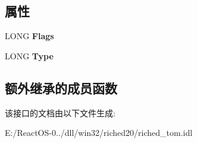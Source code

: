 \subsection*{属性}
\begin{DoxyCompactItemize}
\item 
\mbox{\label{interfacetom_1_1_i_text_selection_adb61c8d597ce766edd46c243d53411e7}} 
L\+O\+NG {\bfseries Flags}
\item 
\mbox{\label{interfacetom_1_1_i_text_selection_a25772c95f3ce8293dcd89d5ce55f8c5e}} 
L\+O\+NG {\bfseries Type}
\end{DoxyCompactItemize}
\subsection*{额外继承的成员函数}


该接口的文档由以下文件生成\+:\begin{DoxyCompactItemize}
\item 
E\+:/\+React\+O\+S-\/0../dll/win32/riched20/riched\+\_\+tom.\+idl\end{DoxyCompactItemize}
